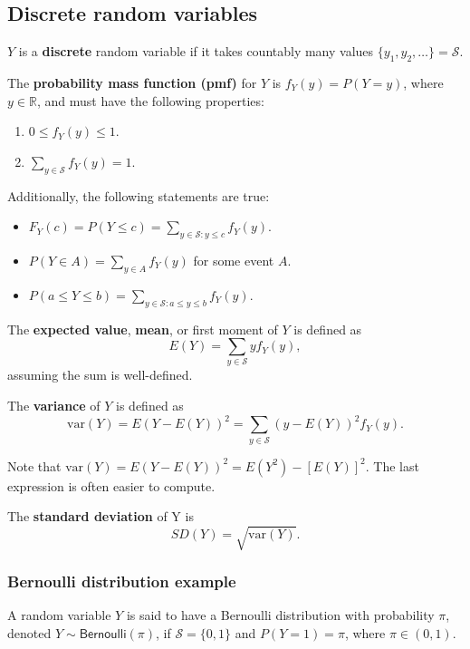 \documentclass[
]{book}
\providecommand{\tightlist}{%
  \setlength{\itemsep}{0pt}\setlength{\parskip}{0pt}}
\theoremstyle{definition}
\theoremstyle{definition}
\theoremstyle{definition}
\theoremstyle{definition}
\theoremstyle{remark}
\begin{document}
\hypertarget{discrete-random-variables}{%
\subsection{Discrete random variables}\label{discrete-random-variables}}

\(Y\) is a \textbf{discrete} random variable if it takes countably many values \(\{y_1, y_2, \dots \} = \mathcal{S}\).

The \textbf{probability mass function (pmf)} for \(Y\) is \(f_Y (y)=P(Y=y)\), where \(y\in \mathbb{R}\), and must have the following properties:

\begin{enumerate}
\def\labelenumi{\arabic{enumi}.}
\tightlist
\item
  \(0 \leq f_Y(y) \leq 1\).
\item
  \(\sum_{y\in \mathcal{S}} f_Y(y) = 1\).
\end{enumerate}

Additionally, the following statements are true:

\begin{itemize}
\tightlist
\item
  \(F_Y(c) = P(Y \leq c) = \sum_{y\in \mathcal{S}:y \leq c} f_Y(y)\).
\item
  \(P(Y \in A) = \sum_{y \in A} f_Y(y)\) for some event \(A\).
\item
  \(P(a \leq Y \leq b) = \sum_{y\in\mathcal{S}:a\leq y\leq b} f_Y(y)\).
\end{itemize}

The \textbf{expected value}, \textbf{mean}, or first moment of \(Y\) is defined as
\[ E(Y) = \sum_{y\in \mathcal{S}} y f_Y(y), \]
assuming the sum is well-defined.

The \textbf{variance} of \(Y\) is defined as
\[
\mathrm{var}(Y)=E(Y-E(Y))^2 = 
\sum_{y\in \mathcal{S}} (y - E(Y))^2 f_Y(y).
\]

Note that \(\mathrm{var}(Y)=E(Y-E(Y))^2=E(Y^2)-[E(Y)]^2\). The last expression is often easier to compute.

The \textbf{standard deviation} of Y is
\[SD(Y)=\sqrt{\mathrm{var}(Y)  }.\]

\hypertarget{bernoulli-distribution-example}{%
\subsubsection{Bernoulli distribution example}\label{bernoulli-distribution-example}}

A random variable \(Y\) is said to have a Bernoulli distribution with probability \(\pi\), denoted \(Y\sim \mathsf{Bernoulli}(\pi)\), if \(\mathcal{S} = \{0, 1\}\) and \(P(Y = 1) = \pi\), where \(\pi\in (0,1)\).
\end{document}
